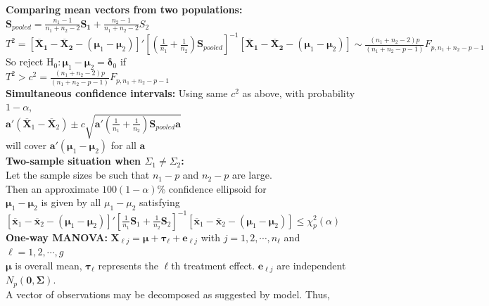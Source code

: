 \documentclass[5pt,twocolumn]{article}
\begin{document}
	\textbf{Comparing mean vectors from two populations:}\\
	\indent $\mathbf{S}_{pooled} = \frac{n_1 - 1}{n_1 + n_2 - 2}\mathbf{S_1} + \frac{n_2 - 1}{n_1 + n_2 - 2}S_2$
	\indent $T^2 = [\mathbf{\overline{X}_1} - \mathbf{\overline{X}_2} - (\mathbf{\mu}_1 - \mathbf{\mu}_2)]'\left[\left(\frac{1}{n_1} + \frac{1}{n_2}\right)\mathbf{S}_{pooled}\right]^{-1}[\mathbf{\overline{X}_1} - \mathbf{\overline{X}_2} - (\mathbf{\mu}_1 - \mathbf{\mu}_2)] \sim \frac{(n_1 + n_2 - 2)p}{(n_1 + n_2 - p - 1)}F_{p, n_1 + n_2 - p - 1}$\\
	\indent So reject $\text{H}_0: \mathbf{\mu}_1 - \mathbf{\mu}_2 = \mathbf{\delta}_0$ if\\
	\indent $T^2 > c^2 = \frac{(n_1 + n_2 - 2)p}{(n_1 + n_2 - p - 1)}F_{p, n_1 + n_2 - p - 1}$\\
	\textbf{Simultaneous confidence intervals:} Using same $c^2$ as above, with probability $1 - \alpha$,\\
	\indent $\mathbf{a}'(\mathbf{\overline{X}}_1 - \mathbf{\overline{X}}_2) \pm c \sqrt{\mathbf{a}'\left(\frac{1}{n_1} + \frac{1}{n_2}\right)\mathbf{S}_{pooled}\mathbf{a}}$\\
	\indent will cover $\mathbf{a}'(\mathbf{\mu}_1 - \mathbf{\mu}_2)$ for all $\mathbf{a}$\\
	\textbf{Two-sample situation when $\Sigma_1 \neq \Sigma_2$:}\\
	\indent Let the sample sizes be such that $n_1 - p$ and $n_2 - p$ are large.\\
	\indent Then an approximate $100(1 - \alpha)$\% confidence ellipsoid for\\
	\indent $\mathbf{\mu}_1 - \mathbf{\mu}_2$ is given by all $\mu_1 - \mu_2$ satisfying\\
	\indent $[\mathbf{\overline{x}}_1 - \mathbf{\overline{x}}_2 - (\mathbf{\mu}_1 - \mathbf{\mu}_2)]'\left[\frac{1}{n_1}\mathbf{S}_1 + \frac{1}{n_2}\mathbf{S}_2\right]^{-1}[\mathbf{\overline{x}}_1 - \mathbf{\overline{x}}_2 - (\mathbf{\mu}_1 - \mathbf{\mu}_2)] \leq \chi^2_p(\alpha)$\\
	\textbf{One-way MANOVA:} $\mathbf{X}_{\ell j} = \mathbf{\mu} + \mathbf{\tau}_{\ell} + \mathbf{e}_{\ell j}$ with $j = 1, 2, \cdots, n_{\ell}$ and $\ell = 1, 2, \cdots, g$\\
	\indent $\mathbf{\mu}$ is overall mean, $\mathbf{\tau}_{\ell}$ represents the $\ell$th treatment effect. $\mathbf{e}_{\ell j}$ are independent $N_p(\mathbf{0}, \mathbf{\Sigma})$.\\
	\indent A vector of observations may be decomposed as suggested by model. Thus,
\end{document}
